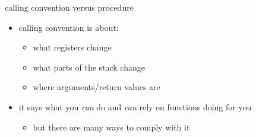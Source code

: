 \begin{frame}{calling convention versus procedure}
\begin{itemize}
\item calling convention is about:
    \begin{itemize}
    \item what registers change
    \item what parts of the stack change
    \item where arguments/return values are
    \end{itemize}
\item it says what you \textit{can} do and \textit{can} rely on functions doing for you
    \begin{itemize}
    \item but there are many ways to comply with it
    \end{itemize}
\end{itemize}
\end{frame}

